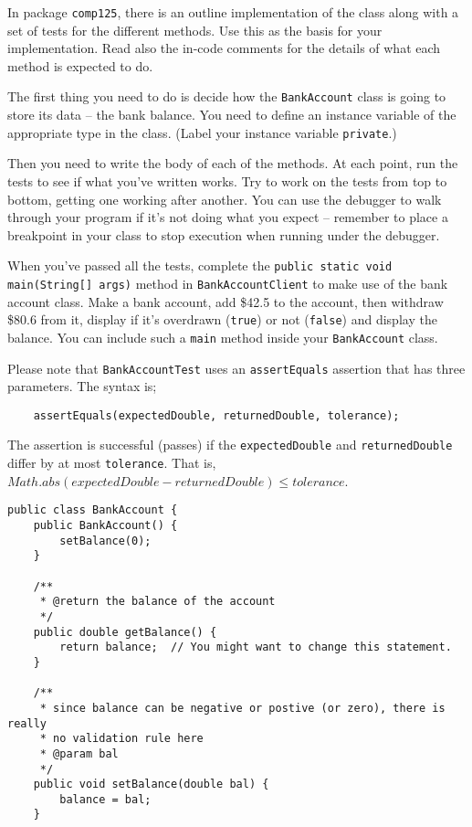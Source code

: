 \begin{questions}
In package \texttt{comp125}, there is an outline implementation of the class along with a set of tests for the different methods. Use this as the basis for your implementation. Read also the in-code comments for the details of what each method is expected to do.

The first thing you need to do is decide how the \texttt{BankAccount} class is going to store its data -- the bank balance. You need to define an instance variable of the appropriate type in the class. (Label your instance variable \texttt{private}.)

Then you need to write the body of each of the methods. At each point, run the tests to see if what you've written works. Try to work on the tests from top to bottom, getting one working after another. You can use the debugger to walk through your program if it's not doing what you expect -- remember to place a breakpoint in your class to stop execution when running under the debugger.

When you've passed all the tests, complete the \texttt{public static void main(String[] args)} method in \newline \texttt{BankAccountClient} to make use of the bank account class. Make a bank account, add \$42.5 to the account, then withdraw \$80.6 from it, display if it's overdrawn (\texttt{true}) or not (\texttt{false}) and display the balance. You can include such a \texttt{main} method inside your \texttt{BankAccount} class.

Please note that \texttt{BankAccountTest} uses an \texttt{assertEquals} assertion that has three parameters. The syntax is;

\begin{lstlisting}
	assertEquals(expectedDouble, returnedDouble, tolerance);
\end{lstlisting}

The assertion is successful (passes) if the \texttt{expectedDouble} and \texttt{returnedDouble} differ by at most \texttt{tolerance}. That is, $Math.abs(expectedDouble - returnedDouble) \le tolerance$.

\begin{solution}
\begin{lstlisting}
public class BankAccount {
	public BankAccount() {
		setBalance(0);
	}
	
	/**
	 * @return the balance of the account
	 */
	public double getBalance() {
		return balance;  // You might want to change this statement.
	}
	
	/**
	 * since balance can be negative or postive (or zero), there is really 
	 * no validation rule here
	 * @param bal
	 */
	public void setBalance(double bal) {
		balance = bal;
	}


\end{lstlisting}
\end{solution}
\end{questions}
